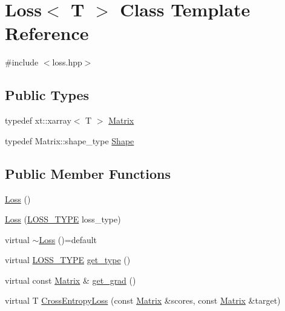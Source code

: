 \hypertarget{class_loss}{}\section{Loss$<$ T $>$ Class Template Reference}
\label{class_loss}


{\ttfamily \#include $<$loss.\+hpp$>$}

\subsection*{Public Types}
\begin{DoxyCompactItemize}
\item 
typedef xt\+::xarray$<$ T $>$ \mbox{\hyperlink{class_loss_a0cb2ca4ba669a18f628d747a995cd26c}{Matrix}}
\item 
typedef Matrix\+::shape\+\_\+type \mbox{\hyperlink{class_loss_a5523cc159d9a0707e9e3fd447f0a832a}{Shape}}
\end{DoxyCompactItemize}
\subsection*{Public Member Functions}
\begin{DoxyCompactItemize}
\item 
\mbox{\hyperlink{class_loss_a76394ddc3da09eb5d4929e1ea03a667c}{Loss}} ()
\item 
\mbox{\hyperlink{class_loss_a5b75c55ce90781d1b12d02f1bedbfa4f}{Loss}} (\mbox{\hyperlink{loss_8hpp_a72b6675b9bd68360ebc6e54006d8220f}{L\+O\+S\+S\+\_\+\+T\+Y\+PE}} loss\+\_\+type)
\item 
virtual \mbox{\hyperlink{class_loss_a93b96fb49b4fedae50e1b275062d9cc5}{$\sim$\+Loss}} ()=default
\item 
virtual \mbox{\hyperlink{loss_8hpp_a72b6675b9bd68360ebc6e54006d8220f}{L\+O\+S\+S\+\_\+\+T\+Y\+PE}} \mbox{\hyperlink{class_loss_a17a1565bd927d068dbb5f556874e7ae7}{get\+\_\+type}} ()
\item 
virtual const \mbox{\hyperlink{class_loss_a0cb2ca4ba669a18f628d747a995cd26c}{Matrix}} \& \mbox{\hyperlink{class_loss_a20cbb31f5e0bb747ba6f8ee6ba25648c}{get\+\_\+grad}} ()
\item 
virtual T \mbox{\hyperlink{class_loss_ad9278bd08a8e63a856f317b58c73195b}{Cross\+Entropy\+Loss}} (const \mbox{\hyperlink{class_loss_a0cb2ca4ba669a18f628d747a995cd26c}{Matrix}} \&scores, const \mbox{\hyperlink{class_loss_a0cb2ca4ba669a18f628d747a995cd26c}{Matrix}} \&target)
\end{DoxyCompactItemize}
